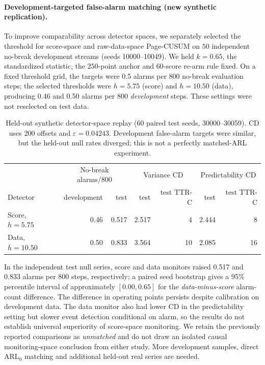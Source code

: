 \documentclass[10pt]{article}
\begin{document}
\paragraph{Development-targeted false-alarm matching (new synthetic
replication).}
To improve comparability across detector spaces, we separately selected the
threshold for score-space and raw-data-space Page-CUSUM on $50$ independent
no-break development streams (seeds 10000--10049). We held
$k=0.65$, the standardized statistic, the $250$-point anchor and $60$-score
re-arm rule fixed. On a fixed threshold grid, the targets were 0.5 alarms
per 800 no-break evaluation steps; the selected thresholds were $h=5.75$
(score) and $h=10.50$ (data), producing 0.46 and 0.50 alarms per 800
\emph{development} steps. These settings were not reselected on test data.
\begin{table}[t]
\centering\small
\caption{Held-out synthetic detector-space replay (60 paired test seeds,
30000--30059). CD uses 200 offsets and $\varepsilon=0.04243$. Development
false-alarm targets were similar, but the held-out null rates diverged; this
is not a perfectly matched-ARL experiment.}
\label{tab:detector-matched}
\begin{tabular}{lrrrrrr}
\toprule
 & \multicolumn{2}{c}{No-break alarms/800} & \multicolumn{2}{c}{Variance CD} & \multicolumn{2}{c}{Predictability CD} \\
Detector & development & test & test & test TTR-C & test & test TTR-C \\
\midrule
Score, $h=5.75$ & 0.46 & 0.517 & 2.517 & 4 & 2.444 & 8 \\
Data, $h=10.50$ & 0.50 & 0.833 & 3.564 & 10 & 2.085 & 16 \\
\bottomrule
\end{tabular}
\end{table}
In the independent test null series, score and data monitors raised 0.517
and 0.833 alarms per 800 steps, respectively; a paired seed bootstrap gives a
95\% percentile interval of approximately $[0.00,0.65]$ for the
\emph{data-minus-score} alarm-count difference. The difference in operating
points persists despite calibration on development data. The data monitor also
had lower CD in the predictability setting but slower event detection
conditional on alarm, so the results do not establish universal superiority of
score-space monitoring. We retain the previously reported comparisons as
\emph{unmatched} and do not draw an isolated causal monitoring-space conclusion
from either study. More development samples, direct ARL$_0$ matching and
additional held-out real series are needed.
\end{document}
